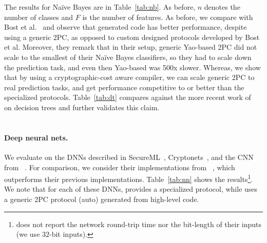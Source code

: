 
The results for Na\"{i}ve Bayes are
in Table~\ref{tab:nb}. As before, $n$ denotes the number of classes and $F$ is the number of features.
As before, we compare with Bost et al.~\cite{shafindss} and observe that \tool generated code
has better performance, despite using a generic 2PC,
as opposed to custom designed protocols developed by Bost et
al. Moreover, they remark that in their setup, generic Yao-based 2PC
did not scale to the smallest of their Na\"{i}ve Bayes classifiers, so
they had to scale down the prediction task, and even then Yao-based \mpc
was 500x slower. Whereas, we show that by using a
cryptographic-cost aware compiler, we can scale generic 2PC to real
prediction tasks, and get performance competitive to or better than the
specialized protocols. Table~\ref{tab:dt} 
compares against the more recent work of~\cite{wu}
on decision trees and further validates this claim.
\\\\
\paragraph{Deep neural nets.}
We evaluate \tool on the DNNs described in SecureML~\cite{secureml},
Cryptonets~\cite{cryptonets}, and the CNN from \minion~\cite{minionn}. For
comparison, we consider their implementations from
\minion~\cite{minionn}, which outperforms their previous
implementations. Table~\ref{tab:nn} shows the
results\footnote{\minion does not report the network round-trip time nor the bit-length of their inputs (we use $32$-bit inputs).}.
We note that for each of these DNNs, \minion provides a
specialized protocol, while \tool uses a generic 2PC protocol
(auto) generated from high-level code.

